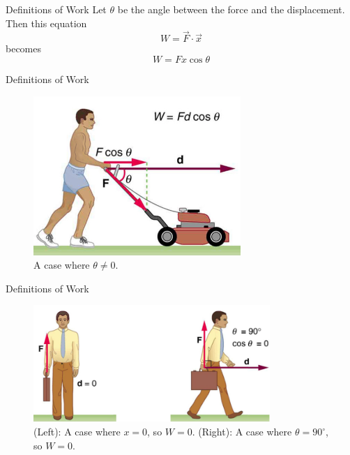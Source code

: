 \documentclass{beamer}
\begin{document}
\begin{frame}{Definitions of Work}
Let $\theta$ be the angle between the force and the displacement.  Then this equation
\begin{equation}
W = \vec{F} \cdot \vec{x}
\end{equation}
becomes
\begin{equation}
W = Fx\cos\theta
\end{equation}
\end{frame}

\begin{frame}{Definitions of Work}
\begin{figure}
\centering
\includegraphics[width=0.7\textwidth]{figures/lawn.png}
\caption{\label{fig:work} A case where $\theta \neq 0$.}
\end{figure}
\end{frame}

\begin{frame}{Definitions of Work}
\begin{figure}
\centering
\includegraphics[width=0.8\textwidth]{figures/lawn2.png}
\caption{\label{fig:work2} (Left): A case where $x = 0$, so $W=0$.  (Right): A case where $\theta = 90^{\circ}$, so $W=0$.}
\end{figure}
\end{frame}
\end{document}
